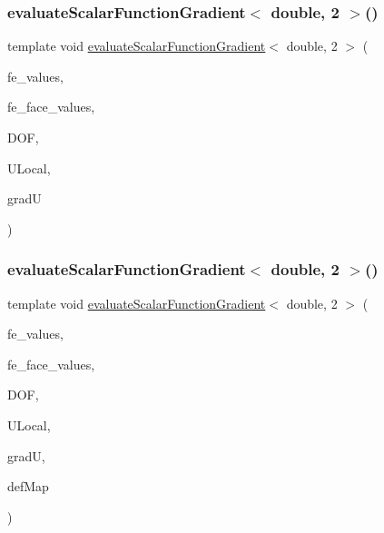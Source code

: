 \mbox{\label{function_evaluations_8cc_a6a96dc1c1ba16074a76b1d809a10a3c6}} 
\subsubsection{\texorpdfstring{evaluate\+Scalar\+Function\+Gradient$<$ double, 2 $>$()}{evaluateScalarFunctionGradient< double, 2 >()}\hspace{0.1cm}{\footnotesize\ttfamily [3/4]}}
{\footnotesize\ttfamily template void \mbox{\hyperlink{group___evaluation_functions_gabedd4ae2841d2332ed0df0513b189e34}{evaluate\+Scalar\+Function\+Gradient}}$<$ double, 2 $>$ (\begin{DoxyParamCaption}\item[{const F\+E\+Values$<$ 2 $>$ \&}]{fe\+\_\+values,  }\item[{const F\+E\+Face\+Values$<$ 2 $>$ \&}]{fe\+\_\+face\+\_\+values,  }\item[{unsigned int}]{D\+OF,  }\item[{Table$<$ 1, double $>$ \&}]{U\+Local,  }\item[{Table$<$ 2, double $>$ \&}]{gradU }\end{DoxyParamCaption})}

\mbox{\label{function_evaluations_8cc_ad5e8e4a735ad40906adb7a5107748ea9}} 
\subsubsection{\texorpdfstring{evaluate\+Scalar\+Function\+Gradient$<$ double, 2 $>$()}{evaluateScalarFunctionGradient< double, 2 >()}\hspace{0.1cm}{\footnotesize\ttfamily [4/4]}}
{\footnotesize\ttfamily template void \mbox{\hyperlink{group___evaluation_functions_gabedd4ae2841d2332ed0df0513b189e34}{evaluate\+Scalar\+Function\+Gradient}}$<$ double, 2 $>$ (\begin{DoxyParamCaption}\item[{const F\+E\+Values$<$ 2 $>$ \&}]{fe\+\_\+values,  }\item[{const F\+E\+Face\+Values$<$ 2 $>$ \&}]{fe\+\_\+face\+\_\+values,  }\item[{unsigned int}]{D\+OF,  }\item[{Table$<$ 1, double $>$ \&}]{U\+Local,  }\item[{Table$<$ 2, double $>$ \&}]{gradU,  }\item[{\mbox{\hyperlink{structdeformation_map}{deformation\+Map}}$<$ double, 2 $>$ \&}]{def\+Map }\end{DoxyParamCaption})}

